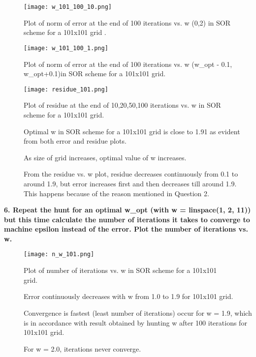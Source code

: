 \documentclass{article}
\begin{document}
\begin{figure}[H] \label{figure}
\texttt{[image: w\_101\_100\_10.png]}
\caption{Plot of norm of error at the end of 100 iterations vs. w (0,2)  in SOR scheme for a 101x101 grid .}
\label{figure:}
\end{figure}

\begin{figure}[H] \label{figure}
\texttt{[image: w\_101\_100\_1.png]}
\caption{Plot of norm of error at the end of 100 iterations vs. w (w\_opt - 0.1, w\_opt+0.1)in SOR scheme for a 101x101 grid.}
\label{figure:}
\end{figure}

\begin{figure}[H] \label{figure}
\texttt{[image: residue\_101.png]}
\caption{Plot of residue at the end of 10,20,50,100 iterations vs. w in SOR scheme for a 101x101 grid.}
\label{figure:}
\end{figure}

\begin{description}
\item[]Optimal w in SOR scheme for a 101x101 grid is close to 1.91 as evident from both error and residue plots.
\item[]As size of grid increases, optimal value of w increases.
\item[]From the residue vs. w plot, residue decreases continuously from 0.1 to around 1.9, but error increases first and then decreases till around 1.9. This happens because of the reason mentioned in Question 2.

\end{description}

\newpage
\textbf{6. Repeat the hunt for an optimal w\_opt (with w = linspace(1, 2, 11)) but this time calculate the number of iterations it takes to converge to machine epsilon instead of the error.  Plot the number of iterations vs. w.}

\begin{figure}[H] \label{figure}
\texttt{[image: n\_w\_101.png]}
\caption{Plot of number of iterations vs. w in SOR scheme for a 101x101 grid.}
\label{figure:}
\end{figure}

\begin{description}
\item[]Error continuously decreases with w from 1.0 to 1.9 for 101x101 grid.
\item[]Convergence is fastest (least number of iterations) occur for w = 1.9, which is in accordance with result obtained by hunting w after 100 iterations for 101x101 grid. 
\item[]For w = 2.0, iterations never converge.

\end{description}
\end{document}
